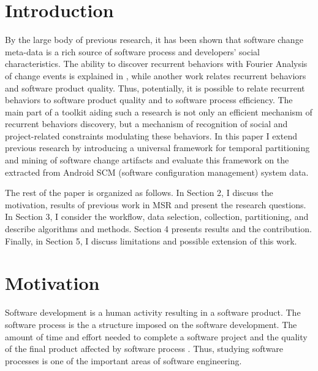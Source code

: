 \documentclass[conference]{IEEEtran}
\begin{document}
\section{Introduction}
By the large body of previous research, it has been shown that software change
meta-data is a rich source of software process and developers' social characteristics. 
The ability to discover recurrent behaviors with Fourier Analysis 
of change events is explained in \cite{citeulike:10377345}, while another work
\cite{citeulike:10392277} relates recurrent behaviors and software product quality.
Thus, potentially, it is possible to relate recurrent behaviors to software product 
quality and to software process efficiency. 
The main part of a toolkit aiding such a research is not only an efficient 
mechanism of recurrent behaviors discovery, but a mechanism of recognition of 
social and project-related constraints modulating these behaviors.
In this paper I extend previous research by introducing a universal 
framework for temporal partitioning and mining of software change 
artifacts and evaluate this framework on the extracted from Android 
SCM (software configuration management) system data. 

The rest of the paper is organized as follows. 
In Section 2, I discuss the motivation, results of previous work in MSR and present 
the research questions. 
In Section 3, I consider the workflow, data selection, collection, partitioning, 
and describe algorithms and methods. Section 4 presents results and the contribution.
Finally, in Section 5, I discuss limitations and possible extension of this work.

\section{Motivation}
Software development is a human activity resulting in a software product. The software
process is the a structure imposed on the software development. 
The amount of time and effort needed to complete a software project and the 
quality of the final product affected by software process \cite{citeulike:9919804}.
 Thus, studying software processes is one of 
the important areas of software engineering. 
\end{document}
